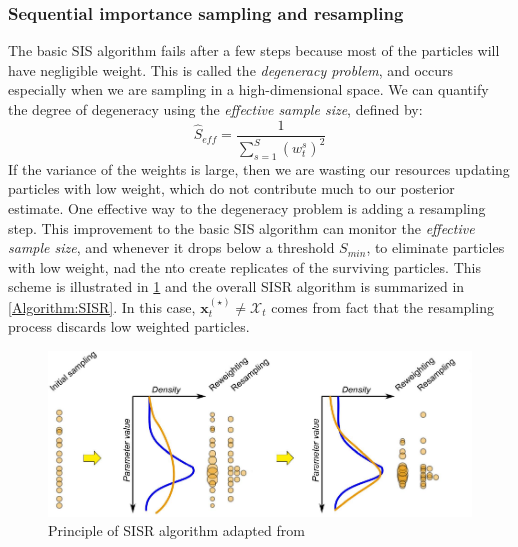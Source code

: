 \subsubsection{Sequential importance sampling and resampling}
The basic \acrshort{SIS} algorithm fails after a few steps because most of the particles will have negligible weight. This is called the \textit{degeneracy problem}, and occurs especially when we are sampling in a high-dimensional space. We can quantify the degree of degeneracy using the \textit{effective sample size}, defined by:
\begin{equation}
    \label{eq: SISR_Seff}
\hat{S}_{eff}=
\frac{1}{\sum_{s=1}^{S} 
(w_{t}^{s})^2
} 
\end{equation}
If the variance of the weights is large, then we are wasting our resources updating particles with low weight, which do not contribute much to our posterior estimate. One effective way to the degeneracy problem is adding a resampling step. This improvement to the basic \acrshort{SIS} algorithm can monitor the \textit{effective sample size}, and whenever it drops below a threshold $S_{min}$, to eliminate particles with low weight, nad the nto create replicates of the surviving particles. This scheme is illustrated in \cref{fig: PF-SISR} and the overall \acrshort{SISR} algorithm is summarized in \ref{Algorithm:SISR}. In this case, $\boldsymbol{x}_{t}^{(\star)} \neq \mathcal{X}_{t}$ comes from fact that the resampling process discards low weighted particles.


\begin{figure}[htbp]
    \centering
    \includegraphics[width = 140mm]{Figures/figure-PF-SISR.pdf}
    \caption{Principle of \acrshort{SISR} algorithm adapted from \protect\cite{speich2021}}
    \label{fig: PF-SISR}
\end{figure}

